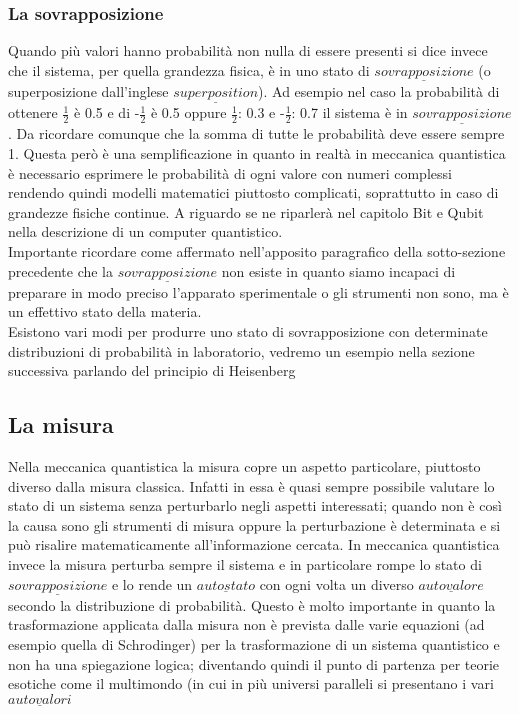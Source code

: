 \subsubsection{La sovrapposizione}
Quando più valori hanno probabilità non nulla di essere presenti si dice invece che il sistema, per quella grandezza fisica, è in uno stato di $\underline{sovrapposizione}$ (o superposizione dall'inglese $\underline{superposition}$). Ad esempio nel caso la probabilità di ottenere $\frac{1}{2}$ è 0.5 e di -$\frac{1}{2}$ è 0.5 oppure $\frac{1}{2}$: 0.3 e -$\frac{1}{2}$: 0.7 il sistema è in $\underline{sovrapposizione}$. Da ricordare comunque che la somma di tutte le probabilità deve essere sempre 1. Questa però è una semplificazione in quanto in realtà in meccanica quantistica è necessario esprimere le probabilità di ogni valore con numeri complessi rendendo quindi modelli matematici piuttosto complicati, soprattutto in caso di grandezze fisiche continue. A riguardo se ne riparlerà nel capitolo Bit e Qubit nella descrizione di un computer quantistico.\\
Importante ricordare come affermato nell'apposito paragrafico della sotto-sezione precedente che la $\underline{sovrapposizione}$ non esiste in quanto siamo incapaci di preparare in modo preciso l'apparato sperimentale o gli strumenti non sono, ma è un effettivo stato  della materia.\\
Esistono vari modi per produrre uno stato di sovrapposizione con determinate distribuzioni di probabilità in laboratorio, vedremo un esempio nella sezione successiva parlando del principio di Heisenberg
\subsection{La misura}
Nella meccanica quantistica la misura copre un aspetto particolare, piuttosto diverso dalla misura classica.
Infatti in essa è quasi sempre possibile valutare lo stato di un sistema senza perturbarlo negli aspetti interessati; quando non è così la causa sono gli strumenti di misura oppure la perturbazione è determinata e si può risalire matematicamente all'informazione cercata.
In meccanica quantistica invece la misura perturba sempre il sistema e in particolare rompe lo stato di $\underline{sovrapposizione}$ e lo rende un $\underline{autostato}$ con ogni volta un diverso $\underline{autovalore}$ secondo la distribuzione di probabilità.
Questo è molto importante in quanto la trasformazione applicata dalla misura non è prevista dalle varie equazioni (ad esempio quella di Schrodinger) per la trasformazione di un sistema quantistico e non ha una spiegazione logica; diventando quindi il punto di partenza per teorie esotiche come il multimondo (in cui in più universi paralleli si presentano i vari $\underline{autovalori}$
